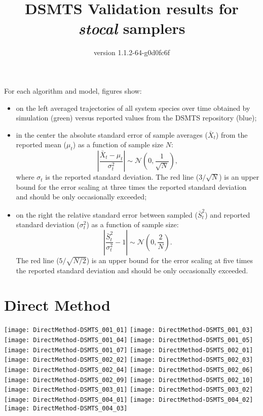 \documentclass[notitlepage]{revtex4-1}
\begin{document}
\title{DSMTS Validation results for \textit{stocal} samplers}
\author{version 1.1.2-64-g0d0fc6f}
\maketitle{}

For each algorithm and model, figures show:
\begin{itemize}
\item on the left averaged trajectories of all system species over time
obtained by simulation (green) versus reported values from the DSMTS
repository (blue);

\item in the center the absolute standard error of sample averages
($\bar X_{t}$) from the reported mean ($\mu_{t}$) as a function of
sample size $N$:
\[
	\left|\frac{\bar X_{t}-\mu_{t}}{\sigma_{t}^{2}}\right| \sim \mathcal{N}\left(0, \frac{1}{\sqrt{N}}\right),
\]
where $\sigma_{t}$ is the reported standard deviation.
The red line ($3/\sqrt{N}$) is an upper bound for the error scaling
at three times the reported standard deviation and should be only
occasionally exceeded;

\item on the right the relative standard error between sampled
($\bar S_{t}^{2}$) and reported standard deviation ($\sigma_{t}^{2}$)
as a function of sample size:
\[
	\left|\frac{\bar S_{t}^{2}}{\sigma_{t}^{2}} - 1\right| \sim \mathcal{N}\left(0, \frac{2}{N}\right) .
\]
The red line ($5/\sqrt{N/2}$) is an upper bound for the error scaling
at five times the reported standard deviation and should be only
occasionally exceeded.
\end{itemize}

\section{Direct Method}
\texttt{[image: DirectMethod-DSMTS\_001\_01]}
\texttt{[image: DirectMethod-DSMTS\_001\_03]}
\texttt{[image: DirectMethod-DSMTS\_001\_04]}
\texttt{[image: DirectMethod-DSMTS\_001\_05]}
\texttt{[image: DirectMethod-DSMTS\_001\_07]}
\texttt{[image: DirectMethod-DSMTS\_002\_01]}
\texttt{[image: DirectMethod-DSMTS\_002\_02]}
\texttt{[image: DirectMethod-DSMTS\_002\_03]}
\texttt{[image: DirectMethod-DSMTS\_002\_04]}
\texttt{[image: DirectMethod-DSMTS\_002\_06]}
\texttt{[image: DirectMethod-DSMTS\_002\_09]}
\texttt{[image: DirectMethod-DSMTS\_002\_10]}
\texttt{[image: DirectMethod-DSMTS\_003\_01]}
\texttt{[image: DirectMethod-DSMTS\_003\_02]}
\texttt{[image: DirectMethod-DSMTS\_004\_01]}
\texttt{[image: DirectMethod-DSMTS\_004\_02]}
\texttt{[image: DirectMethod-DSMTS\_004\_03]}
\end{document}
